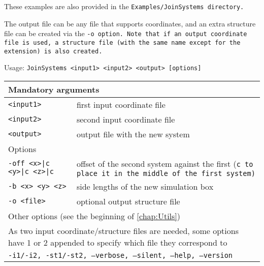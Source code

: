 These examples are also provided in the \tt{Examples/JoinSystems} directory.

The output file can be any file that supports coordinates, and an extra
structure file can be created via the \tt{-o} option. Note that if an output
\vcf coordinate file is used, a \vsf structure file (with the same name except
for the extension) is also created.

\vspace{1em}
\noindent
Usage: \tt{JoinSystems <input1> <input2> <output> [options]}
\noindent
\begin{longtable}{p{}p{}}
  \toprule
  \multicolumn{2}{l}{Mandatory arguments} \\
  \midrule
  \tt{<input1>} & first input coordinate file \\
  \tt{<input2>} & second input coordinate file \\
  \tt{<output>} & output file with the new system \\
  \toprule
  \multicolumn{2}{l}{Options} \\
  \midrule
  \tt{-off <x>|c <y>|c <z>|c} & offset of the second system against the first
                                (\tt{c} to place it in the middle of the first
                                system) \\
  \tt{-b <x> <y> <z>} & side lengths of the new simulation box \\
  \tt{-o <file>} & optional output structure file \\
  \midrule
  \multicolumn{2}{l}{Other options (see the beginning of \cref{chap:Utils})}\\
  \multicolumn{2}{p{0.948\textwidth}}{As two input coordinate/structure files
    are needed, some options have 1 or 2 appended to specify which file they
    correspond to}\\
  \midrule
  \multicolumn{2}{p{0.948\textwidth}}{\tt{-i1}/\tt{-i2},
                                      \tt{-st1}/\tt{-st2},
                                      \tt{--verbose},
                                      \tt{--silent},
                                      \tt{--help},
                                      \tt{--version}}\\
  \bottomrule
\end{longtable}

